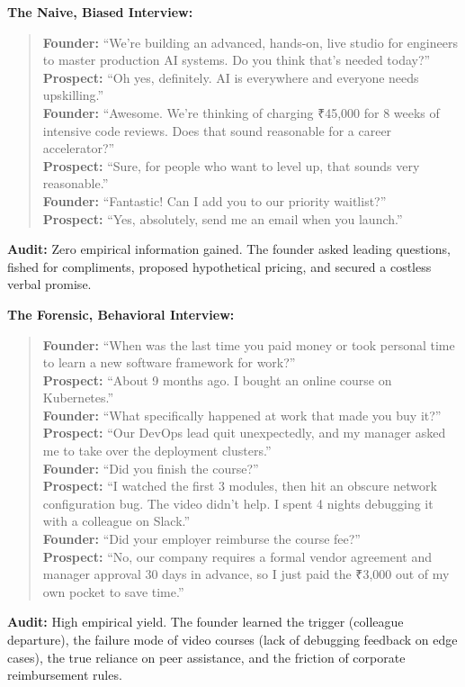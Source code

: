 \noindent\textbf{The Naive, Biased Interview:}
\begin{quote}
\small
\textbf{Founder:} ``We're building an advanced, hands-on, live studio for engineers to master production AI systems. Do you think that's needed today?''\\
\textbf{Prospect:} ``Oh yes, definitely. AI is everywhere and everyone needs upskilling.''\\
\textbf{Founder:} ``Awesome. We're thinking of charging ₹45,000 for 8 weeks of intensive code reviews. Does that sound reasonable for a career accelerator?''\\
\textbf{Prospect:} ``Sure, for people who want to level up, that sounds very reasonable.''\\
\textbf{Founder:} ``Fantastic! Can I add you to our priority waitlist?''\\
\textbf{Prospect:} ``Yes, absolutely, send me an email when you launch.''
\end{quote}
\textbf{Audit:} Zero empirical information gained. The founder asked leading questions, fished for compliments, proposed hypothetical pricing, and secured a costless verbal promise.

\vspace{0.8ex}
\noindent\textbf{The Forensic, Behavioral Interview:}
\begin{quote}
\small
\textbf{Founder:} ``When was the last time you paid money or took personal time to learn a new software framework for work?''\\
\textbf{Prospect:} ``About 9 months ago. I bought an online course on Kubernetes.''\\
\textbf{Founder:} ``What specifically happened at work that made you buy it?''\\
\textbf{Prospect:} ``Our DevOps lead quit unexpectedly, and my manager asked me to take over the deployment clusters.''\\
\textbf{Founder:} ``Did you finish the course?''\\
\textbf{Prospect:} ``I watched the first 3 modules, then hit an obscure network configuration bug. The video didn't help. I spent 4 nights debugging it with a colleague on Slack.''\\
\textbf{Founder:} ``Did your employer reimburse the course fee?''\\
\textbf{Prospect:} ``No, our company requires a formal vendor agreement and manager approval 30 days in advance, so I just paid the ₹3,000 out of my own pocket to save time.''
\end{quote}
\textbf{Audit:} High empirical yield. The founder learned the trigger (colleague departure), the failure mode of video courses (lack of debugging feedback on edge cases), the true reliance on peer assistance, and the friction of corporate reimbursement rules.

